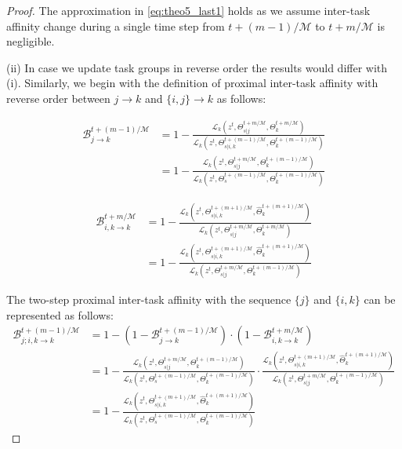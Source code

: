 \begin{proof}
The approximation in \cref{eq:theo5_last1} holds as we assume inter-task affinity change during a single time step from $t+(m-1)/\mathcal{M}$ to $t+m/\mathcal{M}$ is negligible.


(ii) In case we update task groups in reverse order the results would differ with (i). Similarly, we begin with the definition of proximal inter-task affinity with reverse order between $j \rightarrow k$ and $\{i, j\}\rightarrow k$ as follows:

\begin{align}
    \mathcal{B}_{j\rightarrow k}^{t+(m-1)/\mathcal{M}} &= 1-\frac{\mathcal{L}_k(z^t, \Theta_{s|j}^{t+m/\mathcal{M}}, \Theta_k^{t+m/\mathcal{M}})}{\mathcal{L}_k(z^t, \Theta_{s|i,k}^{t+(m-1)/\mathcal{M}}, \Theta_k^{t+(m-1)/\mathcal{M}})}\\
    &= 1-\frac{\mathcal{L}_k(z^t, \Theta_{s|j}^{t+m/\mathcal{M}}, \Theta_k^{t+(m-1)/\mathcal{M}})}{\mathcal{L}_k(z^t, \Theta_s^{t+(m-1)/\mathcal{M}}, \Theta_k^{t+(m-1)/\mathcal{M}})}
\end{align}

\begin{align}
    \mathcal{B}_{i,k \rightarrow k}^{t+m/\mathcal{M}} &= 1-\frac{\mathcal{L}_k(z^t, \Theta_{s|i,k}^{t+(m+1)/\mathcal{M}}, \hat{\Theta}_k^{t+(m+1)/\mathcal{M}})}{\mathcal{L}_k(z^t, \Theta_{s|j}^{t+m/\mathcal{M}}, \Theta_k^{t+m/\mathcal{M}})} \\
    &= 1-\frac{\mathcal{L}_k(z^t, \Theta_{s|i,k}^{t+(m+1)/\mathcal{M}}, \hat{\Theta}_k^{t+(m+1)/\mathcal{M}})}{\mathcal{L}_k(z^t, \Theta_{s|j}^{t+m/\mathcal{M}}, \Theta_k^{t+(m-1)/\mathcal{M}})}
\end{align}

The two-step proximal inter-task affinity with the sequence $\{j\}$ and $\{i, k\}$ can be represented as follows:
\begin{align}
    \mathcal{B}_{j; i,k \rightarrow k}^{t+(m-1)/\mathcal{M}} &= 1- (1-\mathcal{B}_{j\rightarrow k}^{t+(m-1)/\mathcal{M}}) \cdot (1-\mathcal{B}_{i,k \rightarrow k}^{t+m/\mathcal{M}})\\ 
    &= 1-\frac{\mathcal{L}_k(z^t, \Theta_{s|j}^{t+m/\mathcal{M}}, \Theta_k^{t+(m-1)/\mathcal{M}})}{\mathcal{L}_k(z^t, \Theta_s^{t+(m-1)/\mathcal{M}}, \Theta_k^{t+(m-1)/\mathcal{M}})} \cdot \frac{\mathcal{L}_k(z^t, \Theta_{s|i,k}^{t+(m+1)/\mathcal{M}}, \hat{\Theta}_k^{t+(m+1)/\mathcal{M}})}{\mathcal{L}_k(z^t, \Theta_{s|j}^{t+m/\mathcal{M}}, \Theta_k^{t+(m-1)/\mathcal{M}})}\\
    &= 1-\frac{\mathcal{L}_k(z^t, \Theta_{s|i,k}^{t+(m+1)/\mathcal{M}}, \hat{\Theta}_k^{t+(m+1)/\mathcal{M}})}{\mathcal{L}_k(z^t, \Theta_s^{t+(m-1)/\mathcal{M}}, \Theta_k^{t+(m-1)/\mathcal{M}})} \label{eq:theo5_prox2}
\end{align}


\end{proof}

